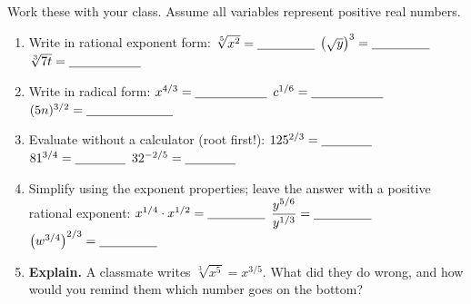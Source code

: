 \documentclass[10pt]{article}
\begin{document}
\begin{practicebox}
Work these with your class. Assume all variables represent positive real numbers.
\begin{enumerate}[leftmargin=1.7em, itemsep=5pt]
  \item Write in rational exponent form: \; $\sqrt[5]{x^{2}}=\blank{1.6cm}$ \quad
        $\left(\sqrt{y}\right)^{3}=\blank{1.6cm}$ \quad $\sqrt[3]{7t}=\blank{2.0cm}$
  \item Write in radical form: \; $x^{4/3}=\blank{2.0cm}$ \quad $c^{1/6}=\blank{2.0cm}$ \quad
        $(5n)^{3/2}=\blank{2.4cm}$
  \item Evaluate without a calculator (root first!): \; $125^{2/3}=\blank{1.4cm}$ \quad
        $81^{3/4}=\blank{1.4cm}$ \quad $32^{-2/5}=\blank{1.4cm}$
  \item Simplify using the exponent properties; leave the answer with a positive rational exponent:
        \; $x^{1/4}\cdot x^{1/2}=\blank{1.6cm}$ \quad $\dfrac{y^{5/6}}{y^{1/3}}=\blank{1.6cm}$ \quad
        $\left(w^{3/4}\right)^{2/3}=\blank{1.6cm}$
  \item \textbf{Explain.} A classmate writes $\sqrt[3]{x^{5}} = x^{3/5}$. What did they do wrong, and
        how would you remind them which number goes on the bottom? 
\end{enumerate}
\end{practicebox}
\end{document}
